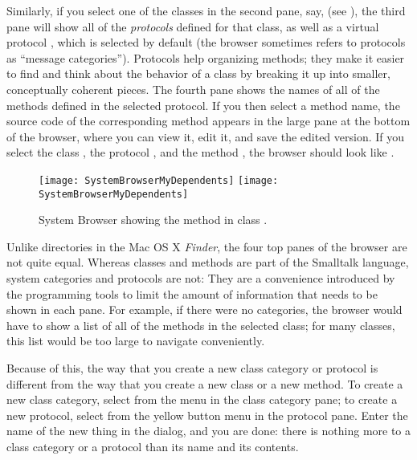\documentclass[a4paper,10pt,twoside]{book}
\begin{document}
Similarly, if you select one of the classes in the second pane, say,  (see ), the third pane will show all of the \emph{protocols} defined for that class, as well as a virtual protocol , which is selected by default (the browser sometimes refers to protocols as ``message categories'').
Protocols help organizing methods; they make it easier to find and think about the behavior of a class by breaking it up into smaller, conceptually coherent pieces.
The fourth pane shows the names of all of the methods defined in the selected protocol.
If you then select a method name, the source code of the corresponding method appears in the large pane at the bottom of the browser, where you can view it, edit it, and save the edited version.
If you select the class , the protocol , and the method , the browser should look like .

\begin{figure}[htbp]
   \centering
   \ifluluelse
	   {\texttt{[image: SystemBrowserMyDependents]}}
	   {\texttt{[image: SystemBrowserMyDependents]}}
   \caption{System Browser showing the  method in class .
   \label{fig:SystemBrowserMyDependents}}
\end{figure}

Unlike directories in the Mac OS X \emph{Finder}, the four top panes of the browser are not quite equal.
Whereas classes and methods are part of the Smalltalk language, system categories and protocols are not:
They are a convenience introduced by the programming tools to limit the amount of information that needs to be shown in each pane.
For example, if there were no categories, the browser would have to show a list of all of the methods in the selected class; for many classes, this list would be too large to navigate conveniently.

Because of this, the way that you create a new class category or protocol is different from the way that you create a new class or a new method.
To create a new class category, select  from the  menu in the class category pane; to create a new protocol, select  from the yellow button menu in the protocol pane.
Enter the name of the new thing in the dialog, and you are done: there is nothing more to a class category or a protocol than its name and its contents.
\end{document}
